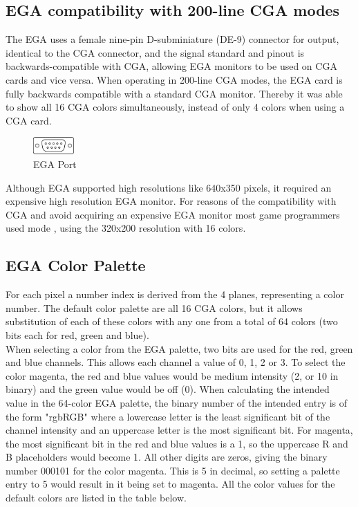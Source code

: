 \documentclass[book.tex]{subfiles}
\begin{document}
 
\subsection{EGA compatibility with 200-line CGA modes}
The EGA uses a female nine-pin D-subminiature (DE-9) connector for output, identical to the CGA connector, and the signal standard and pinout is backwards-compatible with CGA, allowing EGA monitors to be used on CGA cards and vice versa. When operating in 200-line CGA modes, the EGA card is fully backwards compatible with a standard CGA monitor. Thereby it was able to show all 16 CGA colors simultaneously, instead of only 4 colors when using a CGA card.\\

 \begin{figure}[H]
\centering
\includegraphics[width=0.14\textwidth]{imgs/drawings/ports/DE9_serial_port.eps}
\caption{EGA Port}
\label{fig:egaPort}
\end{figure}

Although EGA supported high resolutions like 640x350 pixels, it required an expensive high resolution EGA monitor. For reasons of the compatibility with CGA and avoid acquiring an expensive EGA monitor most game programmers used  mode , using the 320x200 resolution with 16 colors.


  
\subsection{EGA Color Palette}
For each pixel a number index is derived from the 4 planes, representing a color number. The default color palette are all 16 CGA colors, but it allows substitution of each of these colors with any one from a total of 64 colors (two bits each for red, green and blue).\\

When selecting a color from the EGA palette, two bits are used for the red, green and blue channels. This allows each channel a value of 0, 1, 2 or 3. To select the color magenta, the red and blue values would be medium intensity (2, or 10 in binary) and the green value would be off (0). When calculating the intended value in the 64-color EGA palette, the binary number of the intended entry is of the form "rgbRGB" where a lowercase letter is the least significant bit of the channel intensity and an uppercase letter is the most significant bit. For magenta, the most significant bit in the red and blue values is a 1, so the uppercase R and B placeholders would become 1. All other digits are zeros, giving the binary number 000101 for the color magenta. This is 5 in decimal, so setting a palette entry to 5 would result in it being set to magenta. All the color values for the default colors are listed in the table below.\\
\end{document}
